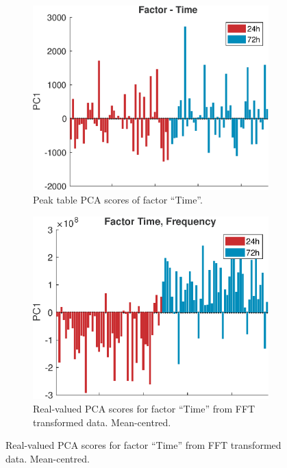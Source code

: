 \documentclass[preprint,12pt]{elsarticle}
\begin{document}
\begin{figure}[hbtp!]
    \centering
    \begin{subfigure}[b]{0.45\textwidth}
        \centering
        \includegraphics[width=\textwidth]{figures/peak_time.eps}
        \caption{Peak table PCA scores of factor ``Time''.}
        \label{fig:figure1}
    \end{subfigure}
    \hfill
    \begin{subfigure}[b]{0.45\textwidth}
        \centering
        \includegraphics[width=\textwidth]{figures/freq_time_mn.eps}
        \caption{Real-valued PCA scores for factor ``Time'' from FFT transformed data. Mean-centred.}
        \label{fig:figure2}
    \end{subfigure}
    

\end{figure}
\end{document}
